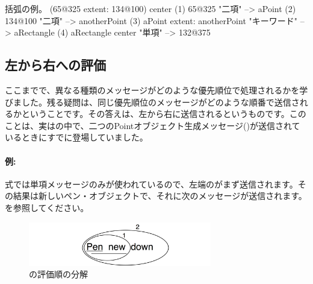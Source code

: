 \documentclass[a4paper,10pt,twoside]{book}
\begin{document}
\begin{example}[decExtent]{括弧の例。}{}
      (65@325 extent: 134@100) center
(1)   65@325                                                    "二項"
    --> aPoint
(2)                                134@100                     "二項"
                                 --> anotherPoint
(3)   aPoint extent: anotherPoint                       "キーワード"
      --> aRectangle
(4)   aRectangle center                                     "単項"
      --> 132@375
\end{example}

\subsection{左から右への評価}
ここまでで、異なる種類のメッセージがどのような優先順位で処理されるかを学びました。残る疑問は、同じ優先順位のメッセージがどのような順番で送信されるかということです。その答えは、左から右に送信されるというものです。このことは、実はの中で、二つのPointオブジェクト生成メッセージ()が送信されているときにすでに登場していました。



\paragraph{例:} 式では単項メッセージのみが使われているので、左端のがまず送信されます。その結果は新しいペン・オブジェクトで、それに次のメッセージが送信されます。を参照してください。

\begin{figure}
	\centering
	\includegraphics[width=8cm]{ucompoUn}
	\caption{の評価順の分解}
\end{figure}
\end{document}
